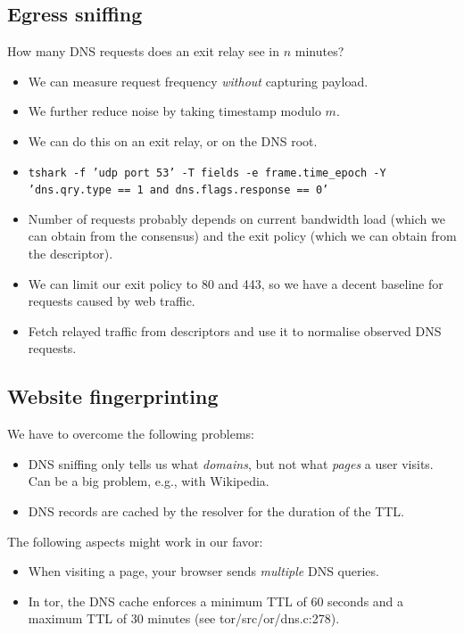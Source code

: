 \subsection{Egress sniffing}

How many DNS requests does an exit relay see in $n$ minutes?
\begin{itemize}
	\item We can measure request frequency \emph{without} capturing payload.
	\item We further reduce noise by taking timestamp modulo $m$.
	\item We can do this on an exit relay, or on the DNS root.
	\item \texttt{tshark -f 'udp port 53' -T fields -e frame.time\_epoch -Y 'dns.qry.type == 1 and dns.flags.response == 0'}
	\item Number of requests probably depends on current bandwidth load (which
		we can obtain from the consensus) and the exit policy (which we can
		obtain from the descriptor).
	\item We can limit our exit policy to 80 and 443, so we have a decent
		baseline for requests caused by web traffic.
	\item Fetch relayed traffic from descriptors and use it to normalise
		observed DNS requests.
\end{itemize}

\subsection{Website fingerprinting}
We have to overcome the following problems:
\begin{itemize}
	\item DNS sniffing only tells us what \emph{domains}, but not what
		\emph{pages} a user visits.  Can be a big problem, e.g., with Wikipedia.
	\item DNS records are cached by the resolver for the duration of the TTL.
\end{itemize}

The following aspects might work in our favor:
\begin{itemize}
	\item When visiting a page, your browser sends \emph{multiple} DNS queries.
	\item In tor, the DNS cache enforces a minimum TTL of 60 seconds and a maximum
	TTL of 30 minutes (see tor/src/or/dns.c:278).
\end{itemize}

